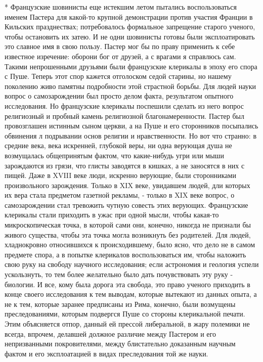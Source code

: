 * Французские шовинисты еще истекшим летом пытались воспользоваться
именем Пастера для какой-то крупной демонстрации против участия
Франции в Кильских празднествах; потребовалось формальное запрещение
старого ученого, чтобы остановить их затею. И не одни шовинисты готовы
были эксплоатировать это славное имя в свою пользу. Пастер мог бы по
праву применить к себе известное изречение: оборони бог от друзей, а с
врагами я справлюсь сам. Такими непрошенными друзьями были французские
клерикалы в эпоху его спора с Пуше. Теперь этот спор кажется
отголоском седой старины, но нашему поколению живо памятны подробности
этой страстной борьбы. Для людей науки вопрос о самозарождении был
просто делом факта, результатом опытного исследования. Но французские
клерикалы поспешили сделать из него вопрос религиозный и пробный
камень религиозной благонамеренности. Пастер был провозглашен истинным
сыном церкви, а на Пуше и его сторонников посыпались обвинения л
подрывании основ религии и нравственности. Но вот что странно: в
средние века, века искренней, глубокой веры, ни одна верующая душа не
возмущалась общепринятым фактом, что какие-нибудь угри или мыши
зарождаются из грязи, что глисты заводятся в кишках, а не заносятся в
них с пищей. Даже в XVIII веке люди, искренно верующие, были
сторонниками произвольного зарождения. Только в XIX веке, увидавшем
людей, дли которых их вера стала предметом газетной рекламы, - только
в XIX веке вопрос, о самозарождении стал тревожить чутную совесть этих
верующих. Французские клерикалы стали приходить в ужас при одной
мысли, чтобы какая-то микроскопическая точка, в которой сами они,
конечно, никогда не признали бы живого существа, чтобы эта точка могла
возникнуть без родителей. Для людей, хладнокровно относившихся к
происходившему, было ясно, что дело не в самом предмете спора, а в
попытке клерикалов воспользоваться им, чтобы наложить свою руку на
свободу научного исследования; если астрономия и геология успели
ускользнуть, то тем более желательно было дать почувствовать эту руку
- биологии. И все, кому была дорога эта свобода, это право ученого
приходить в конце своего исследования к тем выводам, которые вытекают
из данных опыта, а не к тем, которые заранее предписаны из Рима,
конечно, были возмущены преследованиями, которым подвергся Пуше со
стороны клерикальной печати. Этим объясняется отпор, данный ей прессой
либеральной, в жару полемики не всегда, впрочем, делавшей должное
различие между Пастером и его непризванными покровителями, между
блистательно доказанным научным фактом и его эксплоатацией в видах
преследования той же науки.


